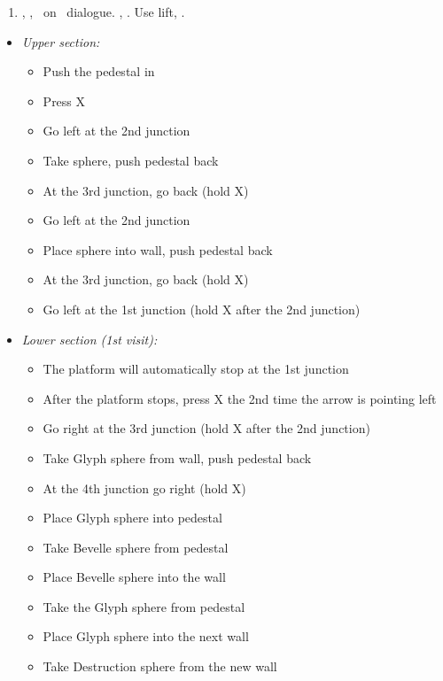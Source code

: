\begin{enumerate}[resume]
    \item \sd, \skippablefmv[1:30], \sd\ on \yuna\ dialogue. \skippablefmv[30], \sd. Use lift, \sd.
\end{enumerate}
\begin{trial}
    \begin{itemize}
        \item \textit{Upper section:}
        \begin{itemize}
            \item Push the pedestal in
            \item Press X
            \item Go left at the 2nd junction
            \item Take sphere, push pedestal back
            \item At the 3rd junction, go back (hold X)
            \item Go left at the 2nd junction
            \item Place sphere into wall, push pedestal back
            \item At the 3rd junction, go back (hold X)
            \item Go left at the 1st junction (hold X after the 2nd junction)
        \end{itemize}
        \item \textit{Lower section (1st visit):}
        \begin{itemize}
            \item The platform will automatically stop at the 1st junction
            \item After the platform stops, press X the 2nd time the arrow is pointing left
            \item Go right at the 3rd junction (hold X after the 2nd junction)
            \item Take Glyph sphere from wall, push pedestal back
            \item At the 4th junction go right (hold X)
            \item Place Glyph sphere into pedestal
            \item Take Bevelle sphere from pedestal
            \item Place Bevelle sphere into the wall
            \item Take the Glyph sphere from pedestal
            \item Place Glyph sphere into the next wall
            \item Take Destruction sphere from the new wall

\end{itemize}
\end{itemize}
\end{trial}
